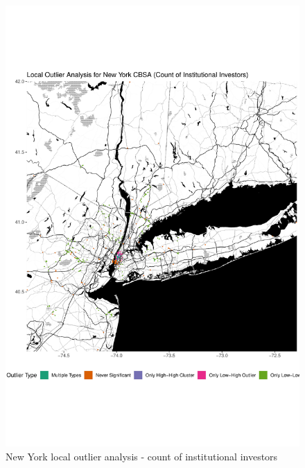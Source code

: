 \begin{figure}
	\centering
	\includegraphics[width=1\linewidth]{Figures/ChapterIV/NY_Count_LO}
	\caption[New York CBSA Local Outlier Analysis - Count of Institutional Investors 1999-2018]{New York local outlier analysis - count of institutional investors}
	\label{fig:NYCcountlocaloutliercount}
\end{figure}	


